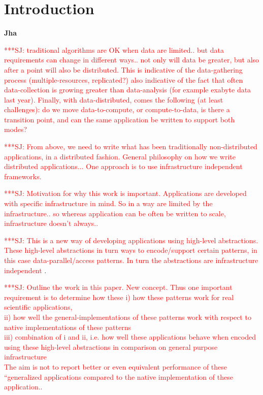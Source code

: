 \documentclass{rspublic}
\newcommand{\jhanote}[1]{ {\textcolor{red} { ***SJ: #1 }}}
\newcommand{\jhanote}[1]{}
\begin{document}
\section{Introduction} {\bf Jha} 

\jhanote{traditional algorithms are OK when data are limited.. but data
  requirements can change in different ways.. not only will data be
  greater, but also after a point will also be distributed. This is
  indicative of the data-gathering process (multiple-resources,
  replicated?) also indicative of the fact that often data-collection
  is growing greater than data-analysis (for example exabyte data last
  year).  Finally, with data-distributed, comes the following (at
  least challenges): do we move data-to-compute, or compute-to-data,
  is there a transition point, and can the same application be written
  to support both modes?}

\jhanote{From above, we need to write what has been traditionally
  non-distributed applications, in a distributed fashion. General
  philosophy on how we write distributed applications... One approach
  is to use infrastructure independent frameworks.}

\jhanote{Motivation for why this work is important. Applications
  are developed with specific infrastructure in mind. So in a
  way are limited by the infrastructure.. so whereas application
  can be often be written to scale, infrastructure doesn't
  always..}

\jhanote{This is a new way of developing applications using high-level
  abstractions. These high-level abstractions in turn ways to
  encode/support certain patterns, in this case data-parallel/access
  patterns. In turn the abstractions are infrastructure independent}.


\jhanote{Outline the work in this paper. New concept. Thus one
  important requirement is to determine how these
  i) how these patterns work for real scientific applications, \\
  ii) how well the general-implementations of these patterns work with
  respect to native implementations of these patterns \\
  iii) combination of i and ii, i.e. how well these applications
  behave when encoded using these high-level abstractions
  in comparison on general purpose infrastructure\\
  The aim is not to report better or even equivalent performance of
  these ``generalized applications compared to the native
  implementation of these application..}
\end{document}
